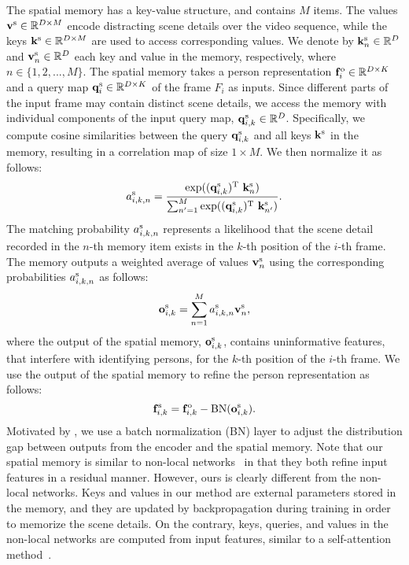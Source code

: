 \documentclass[10pt,twocolumn,letterpaper]{article}
\begin{document}
			The spatial memory has a key-value structure, and contains $M$ items. The values  $\mathbf{v}^{\text s} \in \mathbb{R}^{D \times M}$ encode distracting scene details over the video sequence, while the keys $\mathbf{k}^{\text s} \in \mathbb{R}^{D \times M}$ are used to access corresponding values. We denote by $\mathbf{k}^{\text s}_n \in \mathbb{R}^{D}$ and $\mathbf{v}^{\text s}_n \in \mathbb{R}^{D}$ each key and value in the memory, respectively, where $n \in \{ 1, 2, ... , M\} $. The spatial memory takes a person representation $\mathbf{f}^{\text o}_i \in \mathbb{R}^{D \times K}$ and a query map $\mathbf{q}^{\text s}_i \in \mathbb{R}^{D \times K}$ of the frame $F_i$ as inputs. Since different parts of the input frame may contain distinct scene details, we access the memory with individual components of the input query map, $\mathbf{q}^{\text s}_{i,k} \in \mathbb{R}^{D}$. Specifically, we compute cosine similarities between the query $\mathbf{q}^{\text s}_{i,k}$ and all keys $\mathbf{k}^{\text s}$ in the memory, resulting in a correlation map of size $1 \times M$. We then normalize it as follows:
					\begin{equation}
						a^{\text s}_{i,k,n} = \frac{\exp((\mathbf{q}^{\text s}_{i,k})^{\text T}\ \mathbf{k}^{\text s}_n)}{\sum_{n^\prime=1}^{M} \exp((\mathbf{q}^{\text s}_{i,k})^{\text T}\ \mathbf{k}^{\text s}_{n^\prime})}.
					\label{eq:a_s}
					\end{equation}
			The matching probability $a^{\text s}_{i,k,n}$ represents a likelihood that the scene detail recorded in the $n$-th memory item exists in the $k$-th position of the $i$-th frame. The memory outputs a weighted average of values $\mathbf{v}^{\text s}_n$ using the corresponding probabilities $a^{\text s}_{i,k,n}$ as follows:
					\begin{equation}
						\mathbf{o}^{\text s}_{i,k} = \sum_{n=1}^{M} a^{\text s}_{i,k,n} \mathbf{v}^{\text s}_n,
					\end{equation}
			where the output of the spatial memory, $\mathbf{o}^{\text s}_{i,k}$, contains uninformative features, that interfere with identifying persons, for the $k$-th position of the $i$-th frame. We use the output of the spatial memory to refine the person representation as follows:
					\begin{equation}
						\mathbf{f}^{\text s}_{i,k} = \mathbf{f}^{\text o}_{i,k} - \text {BN}(\mathbf{o}^{\text s}_{i,k}).
						\label{eq:refine}
					\end{equation}
			Motivated by \cite{wang2018non}, we use a batch normalization (BN) layer to adjust the distribution gap between outputs from the encoder and the spatial memory. Note that our spatial memory is similar to non-local networks~\cite{wang2018non} in that they both refine input features in a residual manner. However, ours is clearly different from the non-local networks. Keys and values in our method are external parameters stored in the memory, and they are updated by backpropagation during training in order to memorize the scene details. On the contrary, keys, queries, and values in the non-local networks are computed from input features, similar to a self-attention method~\cite{vaswani2017attention}. 		
			
\end{document}
